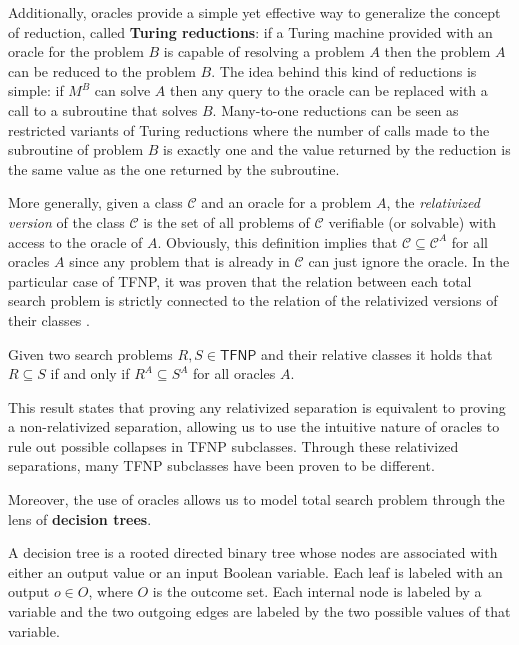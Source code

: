 Additionally, oracles provide a simple yet effective way to generalize the concept of reduction, called \textbf{Turing reductions}: if a Turing machine provided with an oracle for the problem $B$ is capable of resolving a problem $A$ then the problem $A$ can be reduced to the problem $B$. The idea behind this kind of reductions is simple: if $M^B$ can solve $A$ then any query to the oracle can be replaced with a call to a subroutine that solves $B$. Many-to-one reductions can be seen as restricted variants of Turing reductions where the number of calls made to the subroutine of problem $B$ is exactly one and the value returned by the reduction is the same value as the one returned by the subroutine.

More generally, given a class $\mathcal{C}$ and an oracle for a problem $A$, the \textit{relativized version} of the class $\mathcal{C}$ is the set of all problems of $\mathcal{C}$ verifiable (or solvable) with access to the oracle of $A$. Obviously, this definition implies that $\mathcal{C} \subseteq \mathcal{C}^A$ for all oracles $A$ since any problem that is already in $\mathcal{C}$ can just ignore the oracle. In the particular case of \textsf{TFNP}, it was proven that the relation between each total search problem is strictly connected to the relation of the relativized versions of their classes \cite{rel_comp_np_search}.

\begin{theorem}
    Given two search problems $R,S \in \mathsf{TFNP}$ and their relative classes it holds that $R \subseteq S$ if and only if $R^A \subseteq S^A$ for all oracles $A$.
\end{theorem}

This result states that proving any relativized separation is equivalent to proving a non-relativized separation, allowing us to use the intuitive nature of oracles to rule out possible collapses in \textsf{TFNP} subclasses. Through these relativized separations, many \textsf{TFNP} subclasses have been proven to be different.

Moreover, the use of oracles allows us to model total search problem through the lens of \textbf{decision trees}.

\begin{definition}
    A decision tree is a rooted directed binary tree whose nodes are associated with either an output value or an input Boolean variable. Each leaf is labeled with an output $o \in O$, where $O$ is the outcome set. Each internal node is labeled by a variable and the two outgoing edges are labeled by the two possible values of that variable.
\end{definition}

